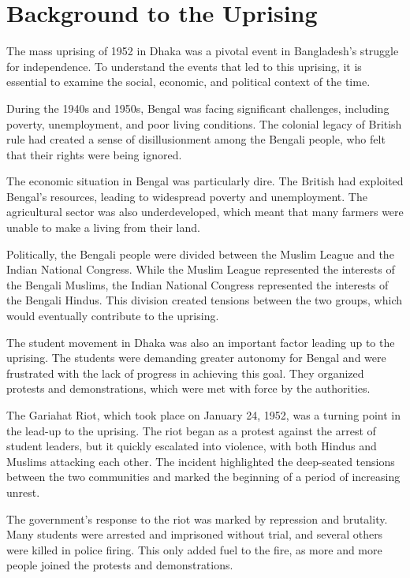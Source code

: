 \section{Background to the Uprising}

The mass uprising of 1952 in Dhaka was a pivotal event in Bangladesh's struggle for independence. To understand the events that led to this uprising, it is essential to examine the social, economic, and political context of the time.

During the 1940s and 1950s, Bengal was facing significant challenges, including poverty, unemployment, and poor living conditions. The colonial legacy of British rule had created a sense of disillusionment among the Bengali people, who felt that their rights were being ignored.

The economic situation in Bengal was particularly dire. The British had exploited Bengal's resources, leading to widespread poverty and unemployment. The agricultural sector was also underdeveloped, which meant that many farmers were unable to make a living from their land.

Politically, the Bengali people were divided between the Muslim League and the Indian National Congress. While the Muslim League represented the interests of the Bengali Muslims, the Indian National Congress represented the interests of the Bengali Hindus. This division created tensions between the two groups, which would eventually contribute to the uprising.

The student movement in Dhaka was also an important factor leading up to the uprising. The students were demanding greater autonomy for Bengal and were frustrated with the lack of progress in achieving this goal. They organized protests and demonstrations, which were met with force by the authorities.

The Gariahat Riot, which took place on January 24, 1952, was a turning point in the lead-up to the uprising. The riot began as a protest against the arrest of student leaders, but it quickly escalated into violence, with both Hindus and Muslims attacking each other. The incident highlighted the deep-seated tensions between the two communities and marked the beginning of a period of increasing unrest.

The government's response to the riot was marked by repression and brutality. Many students were arrested and imprisoned without trial, and several others were killed in police firing. This only added fuel to the fire, as more and more people joined the protests and demonstrations.

